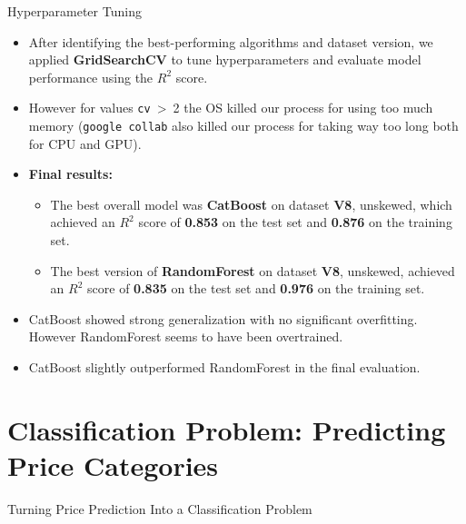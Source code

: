 \documentclass{beamer}
\begin{document}
\begin{frame}{Hyperparameter Tuning}
    \begin{itemize}
        \item After identifying the best-performing algorithms and dataset
                version, we applied \textbf{GridSearchCV} to tune
                hyperparameters and evaluate model performance using the $R^2$
                score.
        \item However for values \texttt{cv}~\textgreater~2 the OS killed our
                process for using too much memory (\texttt{google collab} also
                killed our process for taking way too long both for CPU and
                GPU).
        \item \textbf{Final results:}
        \begin{itemize}
            \item The best overall model was \textbf{CatBoost} on dataset
                    \textbf{V8}, unskewed, which achieved an $R^2$ score of
                    \textbf{0.853} on the test set and \textbf{0.876} on the
                    training set.
            \item The best version of \textbf{RandomForest} on dataset
                    \textbf{V8}, unskewed, achieved an $R^2$ score of
                    \textbf{0.835} on the test set and \textbf{0.976} on the
                    training set.
        \end{itemize}
        \item CatBoost showed strong generalization with no significant
                overfitting. However RandomForest seems to have been
                overtrained.
        \item CatBoost slightly outperformed RandomForest in the final
                evaluation.
    \end{itemize}
\end{frame}

\section{Classification Problem: Predicting Price Categories}
\begin{frame}
        \centering
        \Huge
        Turning Price Prediction Into a Classification Problem
\end{frame}
\end{document}
